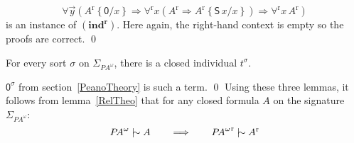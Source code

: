 \documentclass{CSML}
\newcommand*\Derives{\mathrel{|\mkern-8.75mu\sim}}
\newcommand*\SortA{\sigma}
\newcommand*\LogSortedTerm[2]{#1^{#2}}
\newcommand*\LogTermA{t}
\newcommand*\LogVarA{x}
\newcommand*\LogVarB{y}
\newcommand*\LogConst[1]{\mathsf{#1}}
\newcommand*\LogImp{\mathbin{\Rightarrow}}
\newcommand*\LogRelForm[1]{{#1^\mathrm{r}}}
\newcommand*\LogForallRel{\forall^\mathrm{r}}
\newcommand*\LogFormA{A}
\newcommand*\LogSubst[1]{\left\{#1\right\}}
\newcommand*\PA{{P\!A}}
\newcommand*\PAom{{\PA^\omega}}
\newcommand*\CALogZ{\LogConst{0}}
\newcommand*\CALogS{\LogConst{S}}
\newcommand*\CAAxName[1]{{\bm{\scriptstyle(#1)}}}
\newcommand*\CAindName{\CAAxName{ind^r}}
\begin{document}
$$\forall\vec{\LogVarB}\left(\LogRelForm{\LogFormA}\LogSubst{\CALogZ/\LogVarA}\LogImp\LogForallRel\LogVarA\left(\LogRelForm{\LogFormA}\LogImp\LogRelForm{\LogFormA}\LogSubst{\CALogS\,\LogVarA/\LogVarA}\right)\LogImp\LogForallRel\LogVarA\,\LogRelForm{\LogFormA}\right)$$
is an instance of $\CAindName$. Here again, the right-hand context is empty so the proofs are correct.
\qed
\begin{lem}
For every sort $\SortA$ on $\Sigma_\PAom$, there is a closed individual $\LogSortedTerm{\LogTermA}{\SortA}$.
\end{lem}
\proof
$\LogSortedTerm{\CALogZ}{\SortA}$ from section~\ref{PeanoTheory} is such a term.
\qed
Using these three lemmas, it follows from lemma~\ref{RelTheo} that for any closed formula $\LogFormA$ on the signature $\Sigma_\PAom$:
$$\PAom\Derives\LogFormA\qquad\Longrightarrow\qquad\LogRelForm{\PAom}\Derives\LogRelForm{\LogFormA}$$
\end{document}
